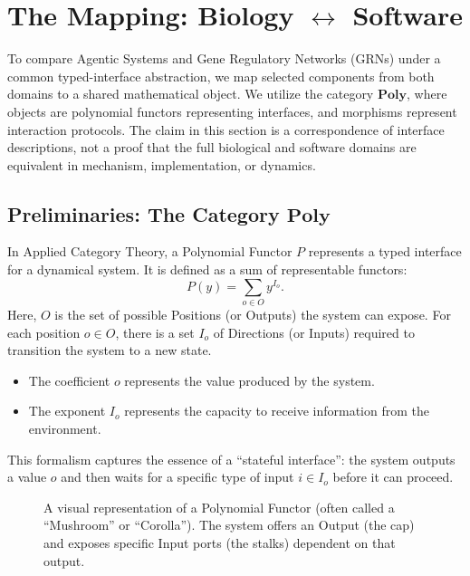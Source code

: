 \section{The Mapping: Biology $\leftrightarrow$ Software}\label{sec:mapping}

To compare Agentic Systems and Gene Regulatory Networks (GRNs) under a common typed-interface
abstraction, we map selected components from both domains to a shared mathematical object. We
utilize the category $\mathbf{Poly}$, where objects are polynomial functors representing interfaces, and
morphisms represent interaction protocols. The claim in this section is a correspondence of interface
descriptions, not a proof that the full biological and software domains are equivalent in mechanism,
implementation, or dynamics.

\subsection{Preliminaries: The Category $\mathbf{Poly}$}

In Applied Category Theory, a Polynomial Functor $P$ represents a typed interface for a dynamical system. It is
defined as a sum of representable functors:
\begin{equation}
P(y) = \sum_{o\in O} y^{I_o}.
\label{eq:poly-functor}
\end{equation}
Here, $O$ is the set of possible Positions (or Outputs) the system can expose. For each position $o\in O$, there
is a set $I_o$ of Directions (or Inputs) required to transition the system to a new state.
\begin{itemize}[leftmargin=*]
\item The coefficient $o$ represents the value produced by the system.
\item The exponent $I_o$ represents the capacity to receive information from the environment.
\end{itemize}
This formalism captures the essence of a ``stateful interface'': the system outputs a value $o$ and then waits
for a specific type of input $i\in I_o$ before it can proceed.

\begin{figure}[h]
\centering
{}
\caption{A visual representation of a Polynomial Functor (often called a ``Mushroom'' or ``Corolla''). The system
offers an Output (the cap) and exposes specific Input ports (the stalks) dependent on that output.}
\end{figure}

